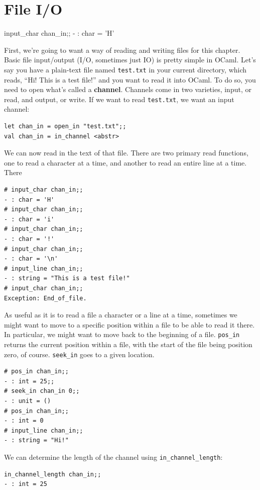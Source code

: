 \documentclass[10pt]{book}
\begin{document}
{\section{File I/O}input_char chan_in;;
- : char = 'H'

First, we're going to want a way of reading and writing files for this chapter. Basic file input/output (I/O, sometimes just IO) is pretty simple in OCaml. Let's say you have a plain-text file named {\tt test.txt} in your current directory, which reads, ``Hi! \n This is a test file!'' and you want to read it into OCaml. To do so, you need to open what's called a {\bf channel}. Channels come in two varieties, input, or read, and output, or write. If we want to read {\tt test.txt}, we want an input channel:
\beforeverb
\begin{verbatim}
let chan_in = open_in "test.txt";;
val chan_in = in_channel <abstr>
\end{verbatim}
\afterverb

We can now read in the text of that file. There are two primary read functions, one to read a character at a time, and another to read an entire line at a time. There 
\beforeverb
\begin{verbatim}
# input_char chan_in;;
- : char = 'H'
# input_char chan_in;;
- : char = 'i'
# input_char chan_in;;
- : char = '!'
# input_char chan_in;;
- : char = '\n'
# input_line chan_in;;
- : string = "This is a test file!"
# input_char chan_in;;
Exception: End_of_file.
\end{verbatim}
\afterverb

As useful as it is to read a file a character or a line at a time, sometimes we might want to move to a specific position within a file to be able to read it there. In particular, we might want to move back to the beginning of a file. {\tt pos_in} returns the current position within a file, with the start of the file being position zero, of course. {\tt seek_in} goes to a given location.
\beforeverb
\begin{verbatim}
# pos_in chan_in;;
- : int = 25;;
# seek_in chan_in 0;;
- : unit = ()
# pos_in chan_in;;
- : int = 0
# input_line chan_in;;
- : string = "Hi!"
\end{verbatim}
\afterverb
We can determine the length of the channel using {\tt in_channel_length}:
\beforeverb
\begin{verbatim}
in_channel_length chan_in;;
- : int = 25
\end{verbatim}
\afterverb

}
\end{document}
